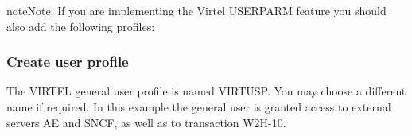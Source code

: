 \documentclass[letterpaper,10pt,english]{sphinxmanual}
\begin{document}
\begin{sphinxadmonition}{note}{Note:}
If you are implementing the Virtel USERPARM feature you should also add the following profiles:

\begin{sphinxVerbatim}[commandchars=\\\{\}]
   
  
             
\end{sphinxVerbatim}
\end{sphinxadmonition}


\subsubsection{Create user profile}
\label{\detokenize{Installation_Guide:create-user-profile}}
\begin{sphinxVerbatim}[commandchars=\\\{\}]
   
         
  
  
  
  
\end{sphinxVerbatim}


The VIRTEL general user profile is named VIRTUSP. You may choose a different name if required. In this example the general user is granted access to external servers AE and SNCF, as well as to transaction W2H-10.
\end{document}
